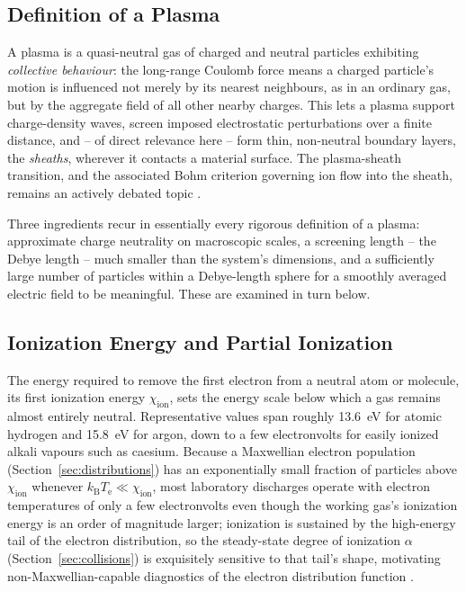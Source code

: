 \subsection{Definition of a Plasma}

A plasma is a quasi-neutral gas of charged and neutral particles exhibiting \emph{collective behaviour}: the long-range Coulomb force means a charged particle's motion is influenced not merely by its nearest neighbours, as in an ordinary gas, but by the aggregate field of all other nearby charges. This lets a plasma support charge-density waves, screen imposed electrostatic perturbations over a finite distance, and -- of direct relevance here -- form thin, non-neutral boundary layers, the \emph{sheaths}, wherever it contacts a material surface. The plasma-sheath transition, and the associated Bohm criterion governing ion flow into the sheath, remains an actively debated topic \cite{ref0001,ref0015}.

Three ingredients recur in essentially every rigorous definition of a plasma: approximate charge neutrality on macroscopic scales, a screening length -- the Debye length -- much smaller than the system's dimensions, and a sufficiently large number of particles within a Debye-length sphere for a smoothly averaged electric field to be meaningful. These are examined in turn below.

\subsection{Ionization Energy and Partial Ionization}

The energy required to remove the first electron from a neutral atom or molecule, its first ionization energy $\chi_{\mathrm{ion}}$, sets the energy scale below which a gas remains almost entirely neutral. Representative values span roughly \SI{13.6}{\electronvolt} for atomic hydrogen and \SI{15.8}{\electronvolt} for argon, down to a few electronvolts for easily ionized alkali vapours such as caesium. Because a Maxwellian electron population (Section~\ref{sec:distributions}) has an exponentially small fraction of particles above $\chi_{\mathrm{ion}}$ whenever $k_{\mathrm{B}} T_{\mathrm{e}} \ll \chi_{\mathrm{ion}}$, most laboratory discharges operate with electron temperatures of only a few electronvolts even though the working gas's ionization energy is an order of magnitude larger; ionization is sustained by the high-energy tail of the electron distribution, so the steady-state degree of ionization $\alpha$ (Section~\ref{sec:collisions}) is exquisitely sensitive to that tail's shape, motivating non-Maxwellian-capable diagnostics of the electron distribution function \cite{ref0194,ref0213}.

